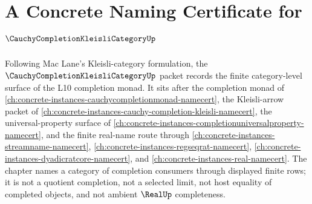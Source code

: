 \chapter{A Concrete Naming Certificate for $\CauchyCompletionKleisliCategoryUp$}
\label{ch:concrete-instances-cauchy-completion-kleisli-category-namecert}

Following Mac Lane's Kleisli-category formulation, the $\CauchyCompletionKleisliCategoryUp$ packet records the finite category-level surface of the L10 completion monad. It sits after the completion monad of \autoref{ch:concrete-instances-cauchycompletionmonad-namecert}, the Kleisli-arrow packet of \autoref{ch:concrete-instances-cauchy-completion-kleisli-namecert}, the universal-property surface of \autoref{ch:concrete-instances-completionuniversalproperty-namecert}, and the finite real-name route through \autoref{ch:concrete-instances-streamname-namecert}, \autoref{ch:concrete-instances-regseqrat-namecert}, \autoref{ch:concrete-instances-dyadicratcore-namecert}, and \autoref{ch:concrete-instances-real-namecert}. The chapter names a category of completion consumers through displayed finite rows; it is not a quotient completion, not a selected limit, not host equality of completed objects, and not ambient $\RealUp$ completeness.


